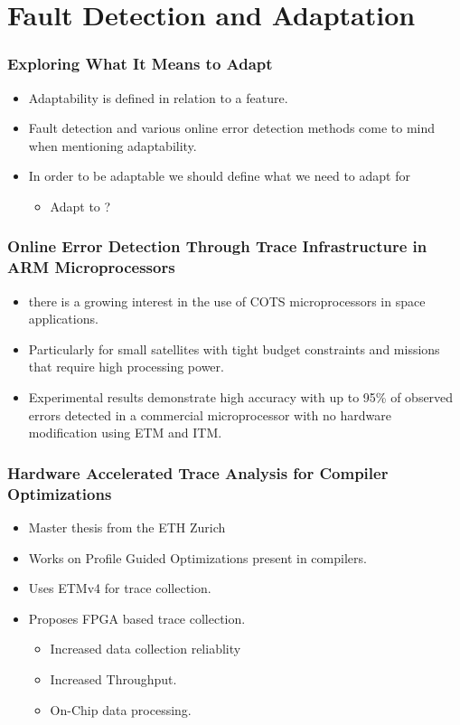 \documentclass{beamer}
\begin{document}
\section{Fault Detection and Adaptation}
\begin{frame}
    \frametitle{Exploring What It Means to Adapt}
    \begin{itemize}
        \item Adaptability is defined in relation to a feature.
        \item Fault detection and various online error detection methods come
            to mind when mentioning adaptability.
        \item In order to be adaptable we should define what we need to adapt
            for
            \begin{itemize}
                \item Adapt to ?
            \end{itemize}
    \end{itemize}
\end{frame}
\begin{frame}
    \frametitle{Online Error Detection Through Trace Infrastructure in
    ARM Microprocessors}
    \begin{itemize}
        \item there is a growing interest in the use of COTS microprocessors
            in space applications.
        \item Particularly for small satellites with tight budget constraints
            and missions that require high processing power.
        \item Experimental results demonstrate high accuracy with up to 95\% 
            of observed errors detected in a commercial microprocessor with
            no hardware modification using ETM and ITM.
    \end{itemize}
\end{frame}
\begin{frame}
    \frametitle{Hardware Accelerated Trace Analysis for Compiler Optimizations}
    \begin{itemize}
        \item Master thesis from the ETH Zurich
        \item Works on Profile Guided Optimizations present in compilers.
        \item Uses ETMv4 for trace collection.
        \item Proposes FPGA based trace collection.
            \begin{itemize}
                \item Increased data collection reliablity
                \item Increased Throughput.
                \item On-Chip data processing.
            \end{itemize}
    \end{itemize}
\end{frame}
\end{document}

